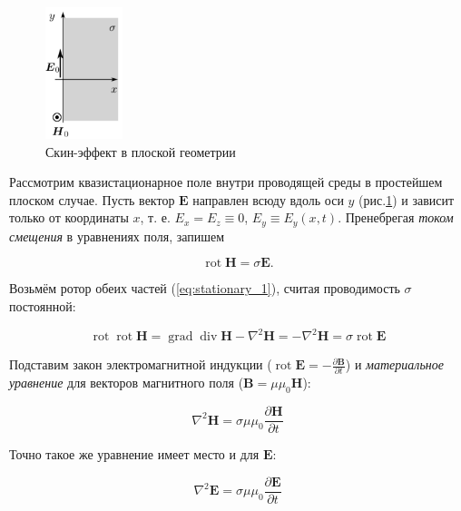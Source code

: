 \documentclass[a4paper, 12pt]{article}
\begin{document}
    \begin{figure}
        \centering
        \includegraphics[width=0.2\textwidth]{images/flat_se.png}
        \caption{Скин-эффект в плоской геометрии}
        \label{fig:flat_se}
    \end{figure}

    Рассмотрим квазистационарное поле внутри проводящей среды в простейшем плоском случае. Пусть вектор $\bm{E}$ направлен всюду вдоль оси $y$ (рис.\ref{fig:flat_se}) и зависит только от координаты $x$, т. е. ${E_x} = {E_z} \equiv 0$, $E_y \equiv E_y(x,t)$. Пренебрегая \textit{током смещения} в уравнениях поля, запишем
    
    \begin{equation}
        \operatorname{rot} \bm{H} = \sigma \bm{E}.
        \label{eq:stationary_1}
    \end{equation}
    
    Возьмём ротор обеих частей (\ref{eq:stationary_1}), считая проводимость $\sigma$ постоянной:
    
    \begin{equation}
        \operatorname{rot} \operatorname{rot} \bm{H} = \operatorname{grad} \operatorname{div} \bm{H} - \nabla^2 \bm{H} = - \nabla^2 \bm{H} = \sigma \operatorname{rot} \bm{E}
    \end{equation}

    Подставим закон электромагнитной индукции ($\operatorname{rot} \bm{E} = - \frac{\partial \bm{B}}{\partial t}$) и \textit{материальное уравнение} для векторов магнитного поля ($\bm{B} = \mu \mu_0 \bm{H}$): 
    
    \begin{equation}
        \nabla^2 \bm{H} = \sigma\mu\mu_0\frac{\partial\bm{H}}{\partial t} 
        \label{eq:stationary_H}
    \end{equation}

    Точно такое же уравнение имеет место и для $\bm{E}$:

    \begin{equation}
        \nabla^2 \bm{E} = \sigma\mu\mu_0\frac{\partial\bm{E}}{\partial t} 
        \label{eq:stationary_E}
    \end{equation}
\end{document}
